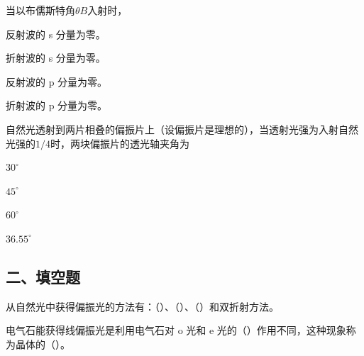 \documentclass[padl, analysis, notocnum]{ExBook}
\newcommand{\answerarea}[1][3.5cm]{%
  \par\vspace{1mm}%
  \noindent{\color{themeColor!35}\rule{\linewidth}{0.4pt}}\par
  \noindent\begin{minipage}[t][#1][t]{\linewidth}\vspace{0pt}\end{minipage}\par
  \noindent{\color{themeColor!35}\rule{\linewidth}{0.4pt}}\par
}
\begin{document}
\begin{qitems}[startnum=14]
\qitem 当以布儒斯特角$\theta B$入射时，
\par\noindent\hspace{2em}反射波的 s 分量为零。
\par\noindent\hspace{2em}折射波的 s 分量为零。
\par\noindent\hspace{2em}反射波的 p 分量为零。
\par\noindent\hspace{2em}折射波的 p 分量为零。
\label{q:313:start}
\answerarea[4.0cm]
\label{q:313:end}
\end{qitems}

\begin{qitems}[startnum=15]
\qitem 自然光透射到两片相叠的偏振片上（设偏振片是理想的），当透射光强为入射自然光强的$1/4$时，两块偏振片的透光轴夹角为
\par\noindent\hspace{2em}$30^{\circ}$
\par\noindent\hspace{2em}$45^{\circ}$
\par\noindent\hspace{2em}$60^{\circ}$
\par\noindent\hspace{2em}$36.55^{\circ}$
\label{q:314:start}
\answerarea[4.0cm]
\label{q:314:end}
\end{qitems}

\subsection{二、填空题}
\begin{qitems}[startnum=1]
\qitem 从自然光中获得偏振光的方法有：（\hspace{1.6em}）、（\hspace{1.6em}）、（\hspace{1.6em}）和双折射方法。
\label{q:315:start}
\answerarea[4.0cm]
\label{q:315:end}
\end{qitems}

\begin{qitems}[startnum=2]
\qitem 电气石能获得线偏振光是利用电气石对 o 光和 e 光的（\hspace{1.6em}）作用不同，这种现象称为晶体的（\hspace{1.6em}）。
\label{q:316:start}
\answerarea[4.0cm]
\label{q:316:end}
\end{qitems}
\end{document}
